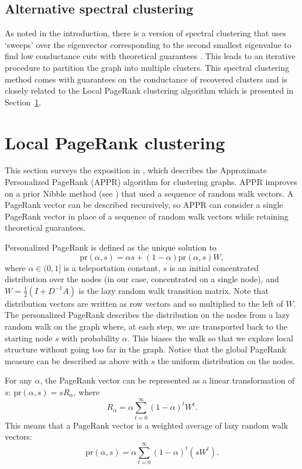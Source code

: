 \documentclass[11pt]{article}
\begin{document}
\subsection*{Alternative spectral clustering}

As noted in the introduction, there is a version of spectral clustering that uses `sweeps' over the eigenvector corresponding to the second smallest eigenvalue to find low conductance cuts with theoretical guarantees \cite{spielman_clustering_works}. This leads to an iterative procedure to partition the graph into multiple clusters. This spectral clustering method comes with guarantees on the conductance of recovered clusters and is closely related to the Local PageRank clustering algorithm which is presented in Section~\ref{Local PageRank clustering}.

\section{Local PageRank clustering}
\label{Local PageRank clustering}

This section surveys the exposition in \cite{pagerank_cluster}, which describes the Approximate Personalized PageRank (APPR) algorithm for clustering graphs. APPR improves on a prior Nibble method (see \cite{spielman}) that used a sequence of random walk vectors. A PageRank vector can be described recursively, so APPR can consider a single PageRank vector in place of a sequence of random walk vectors while retaining theoretical guarantees.

Personalized PageRank is defined as the unique solution to
$$\text{pr}(\alpha,s) = \alpha s + (1-\alpha) \text{pr}(\alpha,s)W,$$
where $\alpha\in(0,1]$ is a teleportation constant, $s$ is an initial concentrated distribution over the nodes (in our case, concentrated on a single node), and $W = \frac{1}{2}(I + D^{-1}A)$ is the lazy random walk transition matrix. Note that distribution vectors are written as row vectors and so multiplied to the left of $W$. The personalized PageRank describes the distribution on the nodes from a lazy random walk on the graph where, at each step, we are transported back to the starting node $s$ with probability $\alpha$. This biases the walk so that we explore local structure without going too far in the graph. Notice that the global PageRank measure can be described as above with $s$ the uniform distribution on the nodes.

For any $\alpha$, the PageRank vector can be represented as a linear transformation of $s$: $\text{pr}(\alpha,s) = s R_\alpha$, where
$$R_\alpha = \alpha \sum_{t=0}^\infty (1-\alpha)^t W^t.$$
This means that a PageRank vector is a weighted average of lazy random walk vectors:
$$\text{pr}(\alpha,s) = \alpha \sum_{t=0}^\infty (1-\alpha)^t (sW^t).$$
\end{document}
